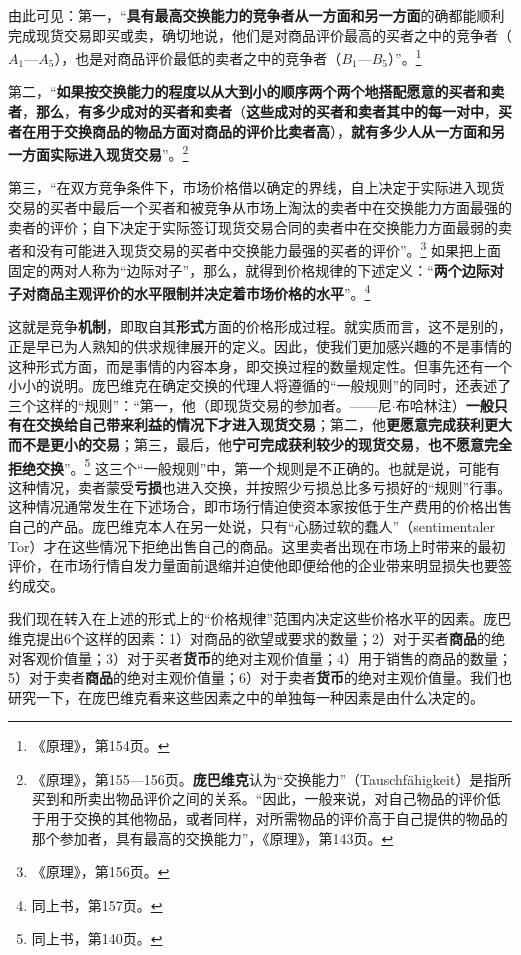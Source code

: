 \documentclass[fontset=fandol, a4paper, 12pt, openright]{ctexbook}
\begin{document}
由此可见：第一，“\textbf{具有最高交换能力的竞争者从一方面和另一方面}的确都能顺利完成现货交易即买或卖，确切地说，他们是对商品评价最高的买者之中的竞争者（$A_1$—$A_5$），也是对商品评价最低的卖者之中的竞争者（$B_1$—$B_5$）”。\footnote{《原理》，第154页。}

第二，“\textbf{如果按交换能力的程度以从大到小的顺序两个两个地搭配愿意的买者和卖者}，\textbf{那么}，\textbf{有多少成对的买者和卖者}（\textbf{这些成对的买者和卖者其中的每一对中}，\textbf{买者在用于交换商品的物品方面对商品的评价比卖者高}），\textbf{就有多少人从一方面和另一方面实际进入现货交易}”。\footnote{《原理》，第155—156页。\textbf{庞巴维克}认为“交换能力”（Tauschf\"{a}higkeit）是指所买到和所卖出物品评价之间的关系。“因此，一般来说，对自己物品的评价低于用于交换的其他物品，或者同样，对所需物品的评价高于自己提供的物品的那个参加者，具有最高的交换能力”，《原理》，第143页。}

第三，“在双方竞争条件下，市场价格借以确定的界线，自上决定于实际进入现货交易的买者中最后一个买者和被竞争从市场上淘汰的卖者中在交换能力方面最强的卖者的评价；自下决定于实际签订现货交易合同的卖者中在交换能力方面最弱的卖者和没有可能进入现货交易的买者中交换能力最强的买者的评价”。\footnote{《原理》，第156页。} 如果把上面固定的两对人称为“边际对子”，那么，就得到价格规律的下述定义：“\textbf{两个边际对子对商品主观评价的水平限制并决定着市场价格的水平}”。\footnote{同上书，第157页。}

这就是竞争\textbf{机制}，即取自其\textbf{形式}方面的价格形成过程。就实质而言，这不是别的，正是早已为人熟知的供求规律展开的定义。因此，使我们更加感兴趣的不是事情的这种形式方面，而是事情的内容本身，即交换过程的数量规定性。但事先还有一个小小的说明。庞巴维克在确定交换的代理人将遵循的“一般规则”的同时，还表述了三个这样的“规则”：“第一，他（即现货交易的参加者。——尼$\cdot$布哈林注）\textbf{一般只有在交换给自己带来利益的情况下才进入现货交易}；第二，他\textbf{更愿意完成获利更大而不是更小的交易}；第三，最后，他\textbf{宁可完成获利较少的现货交易}，\textbf{也不愿意完全拒绝交换}”。\footnote{同上书，第140页。} 这三个“一般规则”中，第一个规则是不正确的。也就是说，可能有这种情况，卖者蒙受\textbf{亏损}也进入交换，并按照少亏损总比多亏损好的“规则”行事。这种情况通常发生在下述场合，即市场行情迫使资本家按低于生产费用的价格出售自己的产品。庞巴维克本人在另一处说，只有“心肠过软的蠢人”（sentimentaler Tor）才在这些情况下拒绝出售自己的商品。这里卖者出现在市场上时带来的最初评价，在市场行情自发力量面前退缩并迫使他即便给他的企业带来明显损失也要签约成交。

我们现在转入在上述的形式上的“价格规律”范围内决定这些价格水平的因素。庞巴维克提出6个这样的因素：1）对商品的欲望或要求的数量；2）对于买者\textbf{商品}的绝对客观价值量；3）对于买者\textbf{货币}的绝对主观价值量；4）用于销售的商品的数量；5）对于卖者\textbf{商品}的绝对主观价值量；6）对于卖者\textbf{货币}的绝对主观价值量。我们也研究一下，在庞巴维克看来这些因素之中的单独每一种因素是由什么决定的。
\end{document}
